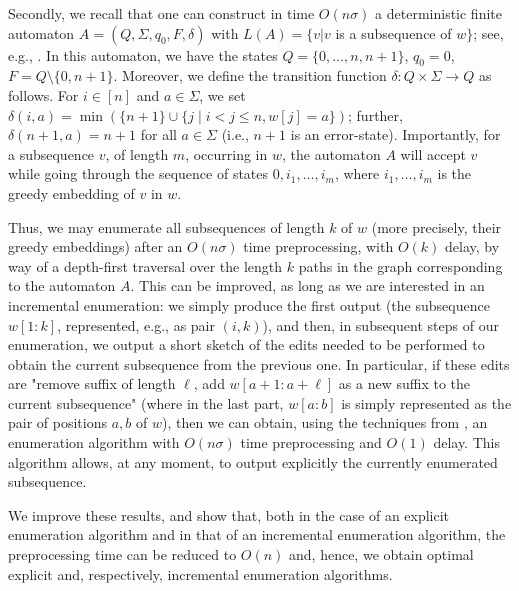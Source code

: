 \documentclass[10pt,a4paper]{amsart}
\theoremstyle{plain}
\theoremstyle{definition}
\begin{document}
Secondly, we recall that one can construct in time $O(n\sigma)$ a deterministic finite automaton $A = (Q,\Sigma,q_0, F, \delta)$ with $L(A) = \{v | v$ is a subsequence of $w\}$; see, e.g., \cite{CrochemoreMT03}. In this automaton, we have the states $Q = \{0,\ldots,n,n+1\}$, $q_0 = 0$, $F=Q\setminus \{0,n+1\}$. Moreover, we define the transition function $\delta:Q\times\Sigma\rightarrow Q$ as follows. For $i\in [n]$ and $a\in \Sigma$, we set $\delta(i,a) =  \min (\{n+1\}\cup \{j\mid i<j\leq n, w[j]=a\}) $; further, $\delta(n+1,a)=n+1$ for all $a\in \Sigma $ (i.e., $n+1$ is an error-state). Importantly, for a subsequence $v$, of length $m$, occurring in $w$, the automaton $A$ will accept $v$ while going through the sequence of states $0, i_1, \ldots, i_m$, where $i_1, \ldots, i_m$ is the greedy embedding of $v$ in $w$. 

Thus, we may enumerate all subsequences of length $k$ of $w$ (more precisely, their greedy embeddings) after an $O(n\sigma)$ time preprocessing, with $O(k)$ delay, by way of a depth-first traversal over the length $k$ paths in the graph corresponding to the automaton $A$.
This can be improved, as long as we are interested in an incremental enumeration: we simply produce the first output (the subsequence $w[1:k]$, represented, e.g., as pair $(i,k)$), and then, in subsequent steps of our enumeration, we output a short sketch of the edits needed to be performed to obtain the current subsequence from the previous one. In particular, if these edits are "remove suffix of length $\ell$, add $w[a+1:a+\ell]$ as a new suffix to the current subsequence" (where in the last part, $w[a:b]$ is simply represented as the pair of positions $a,b$ of $w$), then we can obtain, using the techniques from \cite{AdamsonGM24}, an enumeration algorithm with $O(n\sigma)$ time preprocessing and $O(1)$ delay. This algorithm allows, at any moment, to output explicitly the currently enumerated subsequence.

We improve these results, and show that, both in the case of an explicit enumeration algorithm and in that of an incremental enumeration algorithm, the preprocessing time can be reduced to $O(n)$ and, hence, we obtain optimal explicit and, respectively, incremental enumeration algorithms. 
\end{document}
